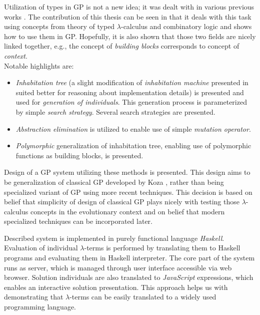 \documentclass[12pt,a4paper]{report}
\newcommand{\lterms}{$\lambda$-terms\xspace}
\begin{document}
Utilization of types in GP is not a new idea; 
it was dealt with in various previous works 
\cite{yu01,montana95,haynes96,olsson94}.
The contribution of this thesis can be seen 
in that it deals with this task using concepts from
theory of typed $\lambda$-calculus and combinatory logic
and shows how to use them in GP.
Hopefully, it is also shown that those two fields are
nicely linked together, e.g., the concept of \textit{building blocks}
corresponds to concept of \textit{context}. \\
 
Notable highlights are: 
\begin{itemize}
 \item \textit{Inhabitation tree} (a slight modification 
   of \textit{inhabitation machine} presented in \cite{barendregt10}
   suited better for reasoning about implementation details) 
   is presented and used for \textit{generation of individuals}.
   This generation process is parameterized by simple 
   \textit{search strategy}. Several search strategies are presented.   
 \item \textit{Abstraction elimination} is utilized
   to enable use of simple \textit{mutation operator}.
 \item \textit{Polymorphic} generalization of inhabitation tree,
   enabling use of polymorphic functions as building blocks, 
   is presented. 

\end{itemize}

Design of a GP system utilizing these methods is presented.
This design aims to be generalization of classical GP 
developed by Koza \cite{koza92}, rather than being 
specialized variant of GP using more recent techniques.
This decision is based on belief
that simplicity of design of classical GP plays nicely
with testing those $\lambda$-calculus concepts in 
the evolutionary context and on belief that modern specialized 
techniques can be incorporated later.
 
Described system is implemented in purely functional language 
\textit{Haskell}. Evaluation of individual \lterms is 
performed by translating them to
Haskell programs and evaluating them in Haskell interpreter. 
The core part of the system runs as server, which is 
managed through user interface accessible via
web browser. Solution individuals are also translated
to \textit{JavaScript} expressions, which enables  
an interactive solution presentation.
This approach helps us with demonstrating 
that \lterms can be easily translated to a 
widely used programming language.
\end{document}
